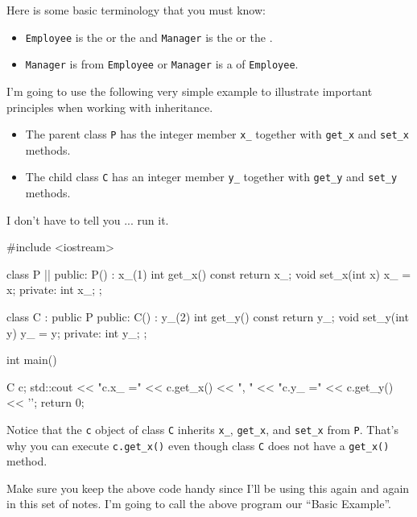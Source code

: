 Here is some basic terminology that you must know:

\begin{itemize}
\item
  \texttt{Employee} is the  or the
   and \texttt{Manager} is the  or
  the .
\item
  \texttt{Manager} is  from \texttt{Employee} or
  \texttt{Manager} is a  of \texttt{Employee}.
\end{itemize}

I'm going to use the following very simple example to illustrate
important principles when working with inheritance.

\begin{itemize}
\item
  The parent class \texttt{P} has the integer member \verb!x_! together
  with \verb!get_x! and \verb!set_x! methods.
\item
  The child class \texttt{C} has an integer member \verb!y_! together
  with \verb!get_y! and \verb!set_y! methods.
\end{itemize}

I don't have to tell you ... run it.

\begin{consolethree}[escapeinside=||]
#include <iostream>

class P
{
||
public:
        P() : x_(1) {}
        int get_x() const { return x_; }
        void set_x(int x) { x_ = x; }
private:
        int x_;
};

class C : public P
{
public:
        C() : y_(2) {}
        int get_y() const { return y_; }
        void set_y(int y) { y_ = y; }
private:
        int y_;
};

int main()
{   
    C c;
    std::cout << "c.x_ =" << c.get_x() << ", "
              << "c.y_ =" << c.get_y() << '\n';
return 0;

} 
\end{consolethree}

Notice that the \texttt{c} object of class \texttt{C} inherits \verb!x_!,
\verb!get_x!, and \verb!set_x! from \texttt{P}. That's why you can
execute \verb!c.get_x()! even though class \texttt{C} does not have a
\verb!get_x()! method.

Make sure you keep the above code handy since I'll be using this again
and again in this set of notes. I'm going to call the above program our
``Basic Example''.

